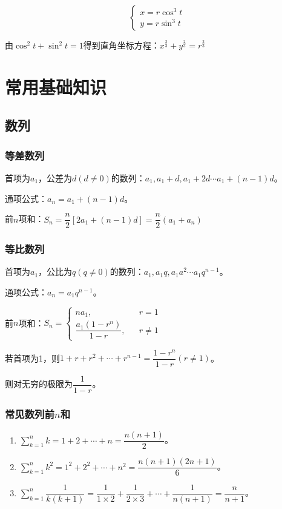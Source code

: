 \documentclass[UTF8, 12pt]{ctexart}
\begin{document}
$$
    \left\{
    \begin{array}{lcl}
        x=r\cos^3t \\
        y=r\sin^3t
    \end{array}
    \right.
$$

由$\cos^2t+\sin^2t=1$得到直角坐标方程：$x^{\frac{2}{3}}+y^{\frac{2}{3}}=r^{\frac{2}{3}}$

\section{常用基础知识}
\subsection{数列}
\subsubsection{等差数列}

首项为$a_1$，公差为$d(d\neq 0)$的数列：$a_1,a_1+d,a_1+2d\cdots a_1+(n-1)d$。

通项公式：$a_n=a_1+(n-1)d$。

前$n$项和：$S_n=\dfrac{n}{2}[2a_1+(n-1)d]=\dfrac{n}{2}(a_1+a_n)$

\subsubsection{等比数列}

首项为$a_1$，公比为$q(q\neq 0)$的数列：$a_1,a_1q,a_1a^2\cdots a_1q^{n-1}$。

通项公式：$a_n=a_1q^{n-1}$。

前$n$项和：$S_n=
    \left\{
    \begin{array}{lcl}
        na_1,                   &  & r=1     \\
        \dfrac{a_1(1-r^n)}{1-r}, &  & r\neq 1
    \end{array}
    \right.$

若首项为1，则$1+r+r^2+\cdots+r^{n-1}=\dfrac{1-r^n}{1-r}(r\neq 1)$。

则对无穷的极限为$\dfrac{1}{1-r}$。

\subsubsection{常见数列前\texorpdfstring{$n$}项和}

\begin{enumerate}
    \item $\sum_{k=1}^nk=1+2+\cdots+n=\dfrac{n(n+1)}{2}$。
    \item $\sum_{k=1}^nk^2=1^2+2^2+\cdots+n^2=\dfrac{n(n+1)(2n+1)}{6}$。
    \item $\sum_{k=1}^n\dfrac{1}{k(k+1)}=\dfrac{1}{1\times 2}+\dfrac{1}{2\times 3}+\cdots+\dfrac{1}{n(n+1)}=\dfrac{n}{n+1}$。
\end{enumerate}
\end{document}
